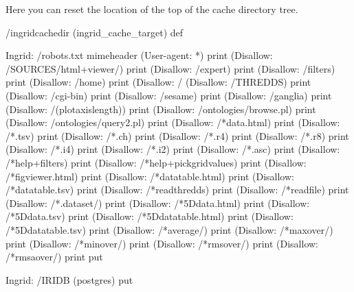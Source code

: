 \documentclass{article}
\begin{document}
Here you can reset the location of the top of the cache directory tree.
\begin{ingrid}
/ingridcachedir ({{ingrid_cache_target}}) def
\end{ingrid}
\begin{ingrid}
Ingrid: /robots.txt {
mimeheader
(User-agent: *\n) print
(Disallow: /SOURCES/html+viewer/\n) print
(Disallow: /expert\n) print
(Disallow: /filters\n) print
(Disallow: /home\n) print
(Disallow: /%
(Disallow: /THREDDS\n) print
(Disallow: /cgi-bin\n) print
(Disallow: /sesame\n) print
(Disallow: /ganglia\n) print
(Disallow: /(plotaxislength)\n) print
(Disallow: /ontologies/browse.pl\n) print
(Disallow: /ontologies/query2.pl\n) print
(Disallow: /*data.html\n) print
(Disallow: /*.tsv\n) print
(Disallow: /*.ch\n) print
(Disallow: /*.r4\n) print
(Disallow: /*.r8\n) print
(Disallow: /*.i4\n) print
(Disallow: /*.i2\n) print
(Disallow: /*.asc\n) print
(Disallow: /*help+filters\n) print
(Disallow: /*help+pickgridvalues\n) print
(Disallow: /*figviewer.html\n) print
(Disallow: /*datatable.html\n) print
(Disallow: /*datatable.tsv\n) print
(Disallow: /*readthredds\n) print
(Disallow: /*readfile\n) print
(Disallow: /*.dataset/\n) print
(Disallow: /*5Ddata.html\n) print
(Disallow: /*5Ddata.tsv\n) print
(Disallow: /*5Ddatatable.html\n) print
(Disallow: /*5Ddatatable.tsv\n) print
(Disallow: /*average/\n) print
(Disallow: /*maxover/\n) print
(Disallow: /*minover/\n) print
(Disallow: /*rmsover/\n) print
(Disallow: /*rmsaover/\n) print
} put
\end{ingrid}

\begin{ingrid}
Ingrid: /IRIDB (postgres) put
\end{ingrid}
\end{document}
